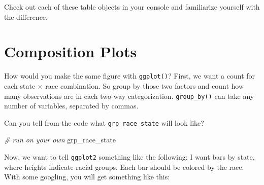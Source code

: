 \documentclass[]{book}
\newenvironment{Shaded}{\begin{snugshade}}{\end{snugshade}}
\newcommand{\CommentTok}[1]{\textcolor[rgb]{0.56,0.35,0.01}{\textit{#1}}}
\newcommand{\KeywordTok}[1]{\textcolor[rgb]{0.13,0.29,0.53}{\textbf{#1}}}
\newcommand{\NormalTok}[1]{#1}
\newcommand{\OperatorTok}[1]{\textcolor[rgb]{0.81,0.36,0.00}{\textbf{#1}}}
\newcommand{\StringTok}[1]{\textcolor[rgb]{0.31,0.60,0.02}{#1}}
\theoremstyle{definition}
\theoremstyle{definition}
\theoremstyle{definition}
\theoremstyle{remark}
\begin{document}
Check out each of these table objects in your console and familiarize yourself with the difference.

\hypertarget{composition-plots}{%
\section{Composition Plots}\label{composition-plots}}

How would you make the same figure with \texttt{ggplot()}? First, we want a count for each state \(\times\) race combination. So group by those two factors and count how many observations are in each two-way categorization. \texttt{group\_by()} can take any number of variables, separated by commas.

\begin{Shaded}
\end{Shaded}

Can you tell from the code what \texttt{grp\_race\_state} will look like?

\begin{Shaded}
\begin{Highlighting}[]
\CommentTok{# run on your own}
\NormalTok{grp_race_state}
\end{Highlighting}
\end{Shaded}

Now, we want to tell \texttt{ggplot2} something like the following: I want bars by state, where heights indicate racial groups. Each bar should be colored by the race. With some googling, you will get something like this:
\end{document}
